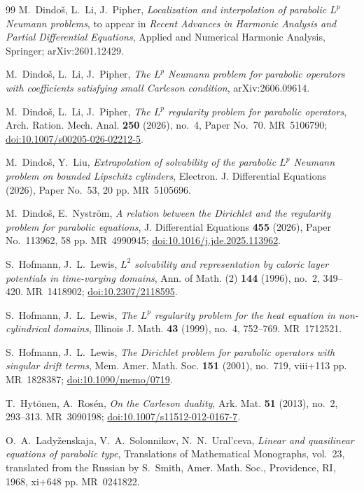 \documentclass[12pt,leqno]{amsart}
\numberwithin{equation}{section}
\theoremstyle{plain}
\theoremstyle{remark}
\begin{document}
\begin{thebibliography}{99}
 M.~Dindo\v s, L.~Li, J.~Pipher, \emph{Localization and
interpolation of parabolic $L^p$ Neumann problems}, to appear in
\emph{Recent Advances in Harmonic Analysis and Partial Differential
Equations}, Applied and Numerical Harmonic Analysis, Springer;
arXiv:2601.12429.

 M.~Dindo\v s, L.~Li, J.~Pipher, \emph{The $L^p$ Neumann problem
for parabolic operators with coefficients satisfying small Carleson condition},
arXiv:2606.09614.

 M.~Dindo\v s, L.~Li, J.~Pipher, \emph{The $L^p$ regularity problem
for parabolic operators}, Arch. Ration. Mech. Anal. \textbf{250} (2026), no.~4,
Paper No.~70. MR~5106790;
\href{https://doi.org/10.1007/s00205-026-02212-5}{doi:10.1007/s00205-026-02212-5}.

 M.~Dindo\v s, Y.~Liu, \emph{Extrapolation of solvability of the
  parabolic $L^p$ Neumann problem on bounded Lipschitz cylinders}, Electron. J.
  Differential Equations (2026), Paper No.~53, 20 pp. MR~5105696.

 M.~Dindo\v s, E.~Nystr\"om, \emph{A relation between the Dirichlet
and the regularity problem for parabolic equations}, J. Differential Equations
\textbf{455} (2026), Paper No.~113962, 58 pp. MR~4990945;
\href{https://doi.org/10.1016/j.jde.2025.113962}{doi:10.1016/j.jde.2025.113962}.

 S.~Hofmann, J.~L.~Lewis, \emph{$L^2$ solvability and
representation by caloric layer potentials in time-varying domains},
Ann. of Math. (2) \textbf{144} (1996), no.~2, 349--420. MR~1418902;
\href{https://doi.org/10.2307/2118595}{doi:10.2307/2118595}.

 S.~Hofmann, J.~L.~Lewis, \emph{The $L^p$ regularity problem
for the heat equation in non-cylindrical domains}, Illinois J. Math.
\textbf{43} (1999), no.~4, 752--769. MR~1712521.

 S.~Hofmann, J.~L.~Lewis, \emph{The Dirichlet problem for
parabolic operators with singular drift terms}, Mem. Amer. Math. Soc.
\textbf{151} (2001), no.~719, viii+113 pp. MR~1828387;
\href{https://doi.org/10.1090/memo/0719}{doi:10.1090/memo/0719}.

 T.~Hyt\"onen, A.~Ros\'en, \emph{On the Carleson duality},
Ark. Mat. \textbf{51} (2013), no.~2, 293--313. MR~3090198;
\href{https://doi.org/10.1007/s11512-012-0167-7}{doi:10.1007/s11512-012-0167-7}.

 O.~A.~Lady\v zenskaja, V.~A.~Solonnikov, N.~N.~Ural'ceva,
\emph{Linear and quasilinear equations of parabolic type}, Translations of
Mathematical Monographs, vol.~23, translated from the Russian by S.~Smith,
Amer. Math. Soc., Providence, RI, 1968, xi+648 pp. MR~0241822.


\end{thebibliography}
\end{document}
